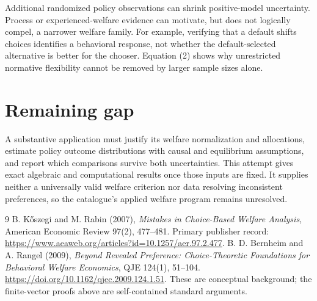 \documentclass[11pt,a4paper]{article}
\begin{document}
Additional randomized policy observations can shrink positive-model uncertainty. Process or experienced-welfare evidence can motivate, but does not logically compel, a narrower welfare family. For example, verifying that a default shifts choices identifies a behavioral response, not whether the default-selected alternative is better for the chooser. Equation (2) shows why unrestricted normative flexibility cannot be removed by larger sample sizes alone.

\section{Remaining gap}
A substantive application must justify its welfare normalization and allocations, estimate policy outcome distributions with causal and equilibrium assumptions, and report which comparisons survive both uncertainties. This attempt gives exact algebraic and computational results once those inputs are fixed. It supplies neither a universally valid welfare criterion nor data resolving inconsistent preferences, so the catalogue's applied welfare program remains unresolved.

\begin{thebibliography}{9}
 B. K\H{o}szegi and M. Rabin (2007), \emph{Mistakes in Choice-Based Welfare Analysis}, American Economic Review 97(2), 477--481. Primary publisher record: \url{https://www.aeaweb.org/articles?id=10.1257/aer.97.2.477}.
 B. D. Bernheim and A. Rangel (2009), \emph{Beyond Revealed Preference: Choice-Theoretic Foundations for Behavioral Welfare Economics}, QJE 124(1), 51--104. \url{https://doi.org/10.1162/qjec.2009.124.1.51}. These are conceptual background; the finite-vector proofs above are self-contained standard arguments.
\end{thebibliography}
\end{document}
